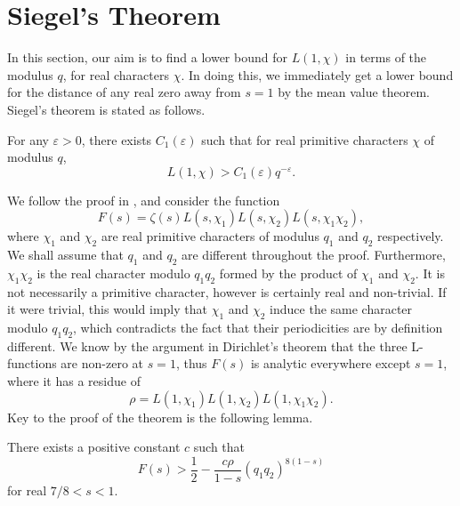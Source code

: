 \section{Siegel's Theorem}
In this section, our aim is to find a lower bound for $L(1, \chi)$ in terms of the modulus $q$, for real characters $\chi$. In doing this, we immediately get a lower bound for the distance of any real zero away from $s = 1$ by the mean value theorem. Siegel's theorem is stated as follows.
\begin{theorem}
For any $\varepsilon > 0$, there exists $C_{1}(\varepsilon)$ such that for real primitive characters $\chi$ of modulus $q$,
\begin{equation}
    L(1, \chi) > C_{1}(\varepsilon) q^{-\varepsilon}. \nonumber
\end{equation}
\end{theorem}
We follow the proof in \cite{Estermann}, and consider the function
\begin{equation}
    F(s) = \zeta(s) L(s, \chi_{1}) L(s, \chi_2) L(s, \chi_1 \chi_2),
\end{equation}
where $\chi_1$ and $\chi_2$ are real primitive characters of modulus $q_1$ and $q_2$ respectively. We shall assume that $q_1$ and $q_2$ are different throughout the proof. Furthermore, $\chi_1\chi_2$ is the real character modulo $q_1q_2$ formed by the product of $\chi_1$ and $\chi_2$. It is not necessarily a primitive character, however is certainly real and non-trivial. If it were trivial, this would imply that $\chi_1$ and $\chi_2$ induce the same character modulo $q_1q_2$, which contradicts the fact that their periodicities are by definition different. We know by the argument in Dirichlet's theorem that the three L-functions are non-zero at $s = 1$, thus $F(s)$ is analytic everywhere except $s = 1$, where it has a residue of 
\begin{equation}
    \rho = L(1, \chi_1) L(1, \chi_2) L(1, \chi_1 \chi_2). \nonumber
\end{equation}
Key to the proof of the theorem is the following lemma.
\begin{lemma}
There exists a positive constant $c$ such that
\begin{equation}
    F(s) > \frac12 - \frac{c \rho}{1 - s} (q_1 q_2)^{8(1-s)}
\end{equation}
for real $7/8 < s < 1$. 
\end{lemma}
